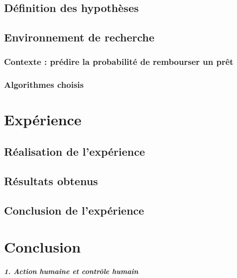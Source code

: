 \documentclass[10pt, french, a4paper]{report}
\begin{document}
\section{Définition des hypothèses}

\section{Environnement de recherche}

\subsection{Contexte : prédire la probabilité de rembourser un prêt}

\subsection{Algorithmes choisis}

\newpage
\chapter{Expérience}

\section{Réalisation de l'expérience}

\section{Résultats obtenus}

\section{Conclusion de l'expérience}


\newpage
\chapter*{Conclusion}

\newpage
% 




\paragraph{1. Action humaine et contrôle humain}
\end{document}
